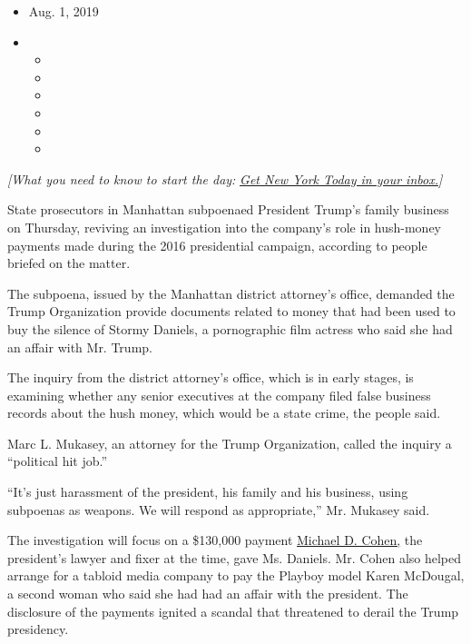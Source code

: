 \begin{itemize}
\item
  Aug. 1, 2019
\item
  \begin{itemize}
  \item
  \item
  \item
  \item
  \item
  \item
  \end{itemize}
\end{itemize}

\emph{{[}What you need to know to start the day:}
\href{https://www.nytimes3xbfgragh.onion/newsletters/newyorktoday?module=inline}{\emph{Get
New York Today in your inbox.}}\emph{{]}}

State prosecutors in Manhattan subpoenaed President Trump's family
business on Thursday, reviving an investigation into the company's role
in hush-money payments made during the 2016 presidential campaign,
according to people briefed on the matter.

The subpoena, issued by the Manhattan district attorney's office,
demanded the Trump Organization provide documents related to money that
had been used to buy the silence of Stormy Daniels, a pornographic film
actress who said she had an affair with Mr. Trump.

The inquiry from the district attorney's office, which is in early
stages, is examining whether any senior executives at the company filed
false business records about the hush money, which would be a state
crime, the people said.

Marc L. Mukasey, an attorney for the Trump Organization, called the
inquiry a ``political hit job.''

``It's just harassment of the president, his family and his business,
using subpoenas as weapons. We will respond as appropriate,'' Mr.
Mukasey said.

The investigation will focus on a \$130,000 payment
\href{https://www.nytimes3xbfgragh.onion/2018/12/12/nyregion/michael-cohen-sentence-trump.html?module=inline}{Michael
D. Cohen,} the president's lawyer and fixer at the time, gave Ms.
Daniels. Mr. Cohen also helped arrange for a tabloid media company to
pay the Playboy model Karen McDougal, a second woman who said she had
had an affair with the president. The disclosure of the payments ignited
a scandal that threatened to derail the Trump presidency.

